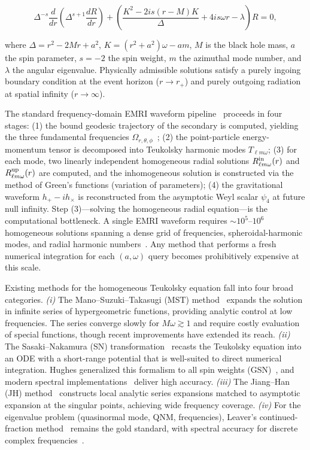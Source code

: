 \documentclass[aps,prd,twocolumn,superscriptaddress,nofootinbib]{revtex4-2}
\begin{document}
\begin{equation}\label{eq:teuk_radial}
  \Delta^{-s}\frac{d}{dr}\!\left(\Delta^{s+1}\frac{dR}{dr}\right)
  + \left(\frac{K^2 - 2 i s(r-M)K}{\Delta}
  + 4 i s \omega r - \lambda\right)R = 0,
\end{equation}

where $\Delta = r^2 - 2Mr + a^2$, $K = (r^2 + a^2)\omega - am$, $M$ is the black
hole mass, $a$ the spin parameter, $s=-2$ the spin weight, $m$ the azimuthal
mode number, and $\lambda$ the angular eigenvalue.  Physically admissible
solutions satisfy a purely ingoing boundary condition at the event horizon
($r\to r_+$) and purely outgoing radiation at spatial infinity ($r\to \infty$).

The standard frequency-domain EMRI waveform pipeline~\cite{Sasaki:2003lr,
Drasco:2006emri} proceeds in four stages: (1) the bound geodesic trajectory of
the secondary is computed, yielding the three fundamental frequencies
$\Omega_{r,\theta,\phi}$~\cite{Fujita:2009geodesic}; (2) the point-particle
energy-momentum tensor is decomposed into Teukolsky harmonic modes
$T_{\ell m \omega}$; (3) for each mode, two linearly independent homogeneous
radial solutions $R^{\rm in}_{\ell m \omega}(r)$ and $R^{\rm up}_{\ell m
\omega}(r)$ are computed, and the inhomogeneous solution is constructed via the
method of Green's functions (variation of parameters); (4) the gravitational
waveform $h_+ - i h_\times$ is reconstructed from the asymptotic Weyl scalar
$\psi_4$ at future null infinity.  Step (3)---solving the homogeneous radial
equation---is the computational bottleneck.  A single EMRI waveform requires
$\sim 10^{5}$--$10^{6}$ homogeneous solutions spanning a dense grid of
frequencies, spheroidal-harmonic modes, and radial harmonic
numbers~\cite{Jiang:2025jh}.  Any method that performs a fresh numerical
integration for each $(a,\omega)$ query becomes prohibitively expensive at this
scale.

Existing methods for the homogeneous Teukolsky equation fall into four broad
categories.  \emph{(i)} The Mano--Suzuki--Takasugi (MST)
method~\cite{Mano:1996gn} expands the solution in infinite series of
hypergeometric functions, providing analytic control at low frequencies.  The
series converge slowly for $M\omega \gtrsim 1$ and require costly evaluation of
special functions, though recent improvements have extended its reach.
\emph{(ii)} The Sasaki--Nakamura (SN) transformation~\cite{Sasaki:1982sx}
recasts the Teukolsky equation into an ODE with a short-range potential that is
well-suited to direct numerical integration.  Hughes generalized this formalism
to all spin weights (GSN)~\cite{Hughes:2000jr}, and modern spectral
implementations~\cite{Rico:2023gwl} deliver high accuracy.  \emph{(iii)} The
Jiang--Han (JH) method~\cite{Jiang:2025jh} constructs local analytic series
expansions matched to asymptotic expansion at the singular points, achieving wide
frequency coverage.  \emph{(iv)} For the eigenvalue problem (quasinormal mode,
QNM, frequencies), Leaver's continued-fraction
method~\cite{Leaver:1985qnm} remains the gold standard, with spectral accuracy
for discrete complex frequencies~\cite{Berti:2009qnm}.
\end{document}
